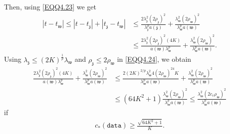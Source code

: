 \documentclass[11pt,oneside, english,reqno,twoside a4paper]{amsart}
\theoremstyle{definition}
\numberwithin{theorem}{section}
\numberwithin{equation}{section}
\newcommand{\mfz}{\mathfrak{z}}
\newcommand{\mfw}{\mathfrak{w}}
\begin{document}
Then, using \eqref{EQQ4.23} we get
\begin{align}\label{EQQ4.24}
    |t-t_{\mathfrak{w}}|\leq |t-t_{\mathfrak{z}}|+|t_{\mathfrak{z}}-t_{\mathfrak{w}}|&\leq \frac{2\lambda^{2}_{\mathfrak{z}}(2\rho_{\mathfrak{z}})^2}{\lambda^p_{\mfz}a(\mathfrak{z})}+\frac{\lambda^{2}_{\mathfrak{w}}(2\rho_{\mathfrak{w}})^2}{\lambda^p_{\mfw}a(\mathfrak{w})}\nonumber\\
    &\leq\frac{2\lambda^2_{\mfz}(2 \rho_{\mfz})^2(4K)}{a(\mfw)\lambda^p_{\mfw}}+\frac{\lambda^{2}_{\mathfrak{w}}(2\rho_{\mathfrak{w}})^2}{\lambda^p_{\mfw}a(\mathfrak{w})}.
\end{align}
Using $\lambda_{\mathfrak z} \leq (2K)^{\frac{1}{p}}\lambda_{\mathfrak w}$ and $\rho_{\mathfrak z}\leq 2\rho_{\mathfrak w}$ in \eqref{EQQ4.24}, we obtain
\begin{align*}
 \frac{2\lambda^2_{\mfz}(2 \rho_{\mfz})^2(4K)}{a(\mfw)\lambda^p_{\mfw}}+\frac{\lambda^{2}_{\mathfrak{w}}(2\rho_{\mathfrak{w}})^2}{\lambda^p_{\mfw}a(\mathfrak{w})}&\leq \frac{2(2K)^{2/p}\lambda^2_{\mfw}4(2\rho_{\mfw})^24K}{\lambda^p_{\mfw}a(\mfw)}+\frac{\lambda^2_{\mfw}(2\rho_{\mfw})^2}{\lambda^p_{\mfw}a(\mfw)}\\
 &\leq \left(64K^2+1\right)\frac{\lambda^2_{\mfw}(2\rho_{\mfw})^2}{\lambda^p_{\mfw}a(\mfw)}\leq \frac{\lambda^2_{\mfw}(2c_v\rho_{\mfw})^2}{\lambda^p_{\mfw}a(\mfw)}
\end{align*}
if \begin{align}\label{c_1}c_*(\texttt{data})\geq \frac{\sqrt{64K^2+1}}{K}.\end{align}
\end{document}
